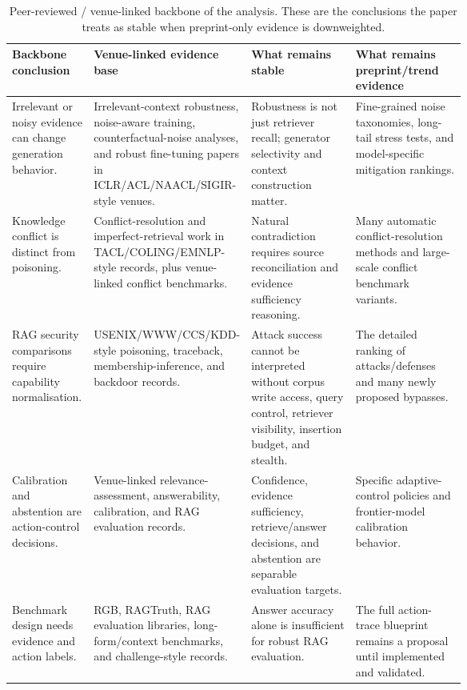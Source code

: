 \begin{table}[t]
\centering
\scriptsize
\renewcommand{\arraystretch}{0.9}
\begin{tabularx}{\linewidth}{>{\raggedright\arraybackslash}p{0.18\linewidth}>{\raggedright\arraybackslash}p{0.25\linewidth}>{\raggedright\arraybackslash}p{0.23\linewidth}X}
\toprule
\textbf{Backbone conclusion} & \textbf{Venue-linked evidence base} & \textbf{What remains stable} & \textbf{What remains preprint/trend evidence} \\
\midrule
Irrelevant or noisy evidence can change generation behavior. & Irrelevant-context robustness, noise-aware training, counterfactual-noise analyses, and robust fine-tuning papers in ICLR/ACL/NAACL/SIGIR-style venues. & Robustness is not just retriever recall; generator selectivity and context construction matter. & Fine-grained noise taxonomies, long-tail stress tests, and model-specific mitigation rankings. \\
Knowledge conflict is distinct from poisoning. & Conflict-resolution and imperfect-retrieval work in TACL/COLING/EMNLP-style records, plus venue-linked conflict benchmarks. & Natural contradiction requires source reconciliation and evidence sufficiency reasoning. & Many automatic conflict-resolution methods and large-scale conflict benchmark variants. \\
RAG security comparisons require capability normalisation. & USENIX/WWW/CCS/KDD-style poisoning, traceback, membership-inference, and backdoor records. & Attack success cannot be interpreted without corpus write access, query control, retriever visibility, insertion budget, and stealth. & The detailed ranking of attacks/defenses and many newly proposed bypasses. \\
Calibration and abstention are action-control decisions. & Venue-linked relevance-assessment, answerability, calibration, and RAG evaluation records. & Confidence, evidence sufficiency, retrieve/answer decisions, and abstention are separable evaluation targets. & Specific adaptive-control policies and frontier-model calibration behavior. \\
Benchmark design needs evidence and action labels. & RGB, RAGTruth, RAG evaluation libraries, long-form/context benchmarks, and challenge-style records. & Answer accuracy alone is insufficient for robust RAG evaluation. & The full action-trace blueprint remains a proposal until implemented and validated. \\
\bottomrule
\end{tabularx}
\caption{Peer-reviewed / venue-linked backbone of the analysis. These are the conclusions the paper treats as stable when preprint-only evidence is downweighted.}
\label{tab:peer-reviewed-backbone}
\end{table}

